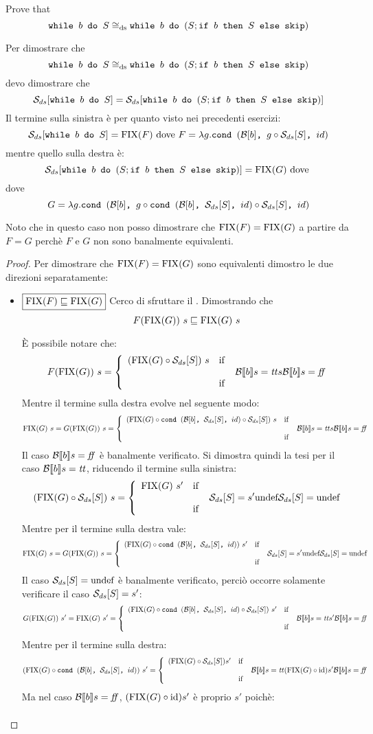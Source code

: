 {Prove that
$$
	\wbS{b}{S} \eqDS \wbS{b}{(S; \ifABC{b}{S}{\skipForFriends})}
$$
}
{
Per dimostrare che 
$$
	\wbS{b}{S} \eqDS \wbS{b}{(S; \ifABC{b}{S}{\skipForFriends})}
$$	
devo dimostrare che
$$
\dsCtxt{\wbS{b}{S}} = \dsCtxt{\wbS{b}{(S; \ifABC{b}{S}{\skipForFriends})}}
$$
Il termine sulla sinistra è per quanto visto nei precedenti esercizi:
$$
\dsCtxt{\wbS{b}{S}} = \fixp{F} \text{ dove } F = \lambda g. \cond{b}{g \circ \dsCtxt{S}}{id}
$$
mentre quello sulla destra è:
$$
\dsCtxt{\wbS{b}{(S; \ifABC{b}{S}{\skipForFriends})}} = \fixp{G} \text{ dove } 
$$
dove 
$$
G = \lambda g. \cond{b}{g \circ \cond{b}{\dsCtxt{S}}{id} \circ \dsCtxt{S}}{id} 
$$

Noto che in questo caso non posso dimostrare che $\fixp{F} = \fixp{G}$ a partire da $F = G$ perchè
$F$ e $G$ non sono banalmente equivalenti.

\begin{proof}
Per dimostrare che $\fixp{F} = \fixp{G}$ sono equivalenti dimostro le due direzioni separatamente:
\begin{itemize}
  \item $\boxed{\fixp{F} \sqsubseteq \fixp{G}}$
  Cerco di sfruttare il \FPIL. Dimostrando che
  $$
  F(\fixp{G})\ s \sqsubseteq \fixp{G}\ s
  $$

  È possibile notare che:
  $$
  F(\fixp{G})\ s =
    \caseFun{(\fixp{G} \circ \dsCtxt{S})\ s}
            {\B{b} = \semtrue}
            {s}
            {\B{b} = \semfalse}
  $$
  Mentre il termine sulla destra evolve nel seguente modo:
  $$
  \fixp{G}\ s= G(\fixp{G})\ s =
    \caseFun{(\fixp{G} \circ \cond{b}{\dsCtxt{S}}{id} \circ \dsCtxt{S})\ s}
            {\B{b} = \semtrue}
            {s}
            {\B{b} = \semfalse}
  $$
  Il caso $\B{b} = \semfalse$ è banalmente verificato. Si dimostra quindi la
  tesi per il caso $\B{b} = \semtrue$, riducendo il termine sulla sinistra:
  $$
  (\fixp{G} \circ \dsCtxt{S})\ s =
    \caseFun{\fixp{G}\ s'}
            {\dsCtxt{S} = s'}
            {\undefDS}
            {\dsCtxt{S} = \undefDS}
  $$
  Mentre per il termine sulla destra vale:
  $$
  \fixp{G}\ s= G(\fixp{G})\ s =
    \caseFun{(\fixp{G} \circ \cond{b}{\dsCtxt{S}}{id})\ s'}
            {\dsCtxt{S} = s'}
            {\undefDS}
            {\dsCtxt{S} = \undefDS}
  $$
  Il caso $\dsCtxt{S} = \undefDS$ è banalmente verificato, perciò occorre
  solamente verificare il caso $\dsCtxt{S} = s'$:
  $$
  G(\fixp{G})\ s' = \fixp{G}\ s' =
    \caseFun{(\fixp{G} \circ \cond{b}{\dsCtxt{S}}{id} \circ \dsCtxt{S})\ s'}
            {\B{b} = \semtrue}
            {s'}
            {\B{b} = \semfalse}
  $$
  Mentre per il termine sulla destra:
  $$
  (\fixp{G} \circ \cond{b}{\dsCtxt{S}}{id})\ s' =
    \caseFun{(\fixp{G} \circ \dsCtxt{S}) s'}
            {\B{b} = \semtrue}
            {(\fixp{G} \circ \idDS) s'}
            {\B{b} = \semfalse}
  $$
  Ma nel caso $\B{b} = \semfalse$, $(\fixp{G} \circ \idDS) s'$ è proprio
  $s'$ poichè:
  $$
  \begin{array}{lr}
  \end{array}
  $$


\end{itemize}
\end{proof}}
